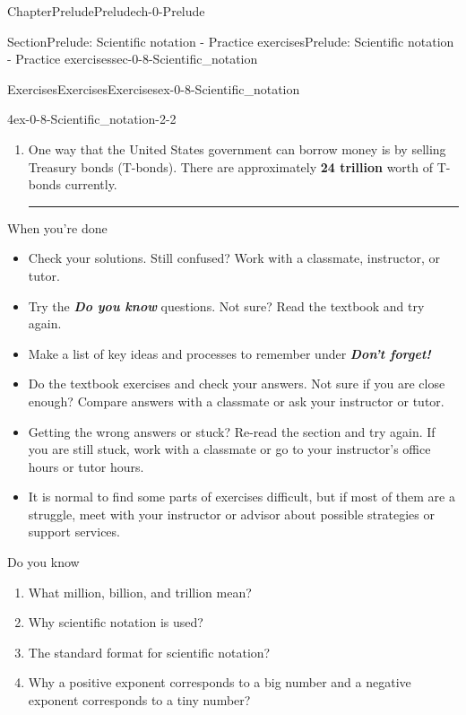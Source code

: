 \documentclass[twoside,11pt,]{book}
\newcommand{\xreffont}{\relax}
\newcommand{\alert}[1]{\textbf{\textit{#1}}}
\newcommand{\terminology}[1]{\textbf{#1}}
\newlength{\workspacestrutwidth}
\numberwithin{equation}{section}
\begin{document}
\begin{chapterptx}{Chapter}{Prelude}{}{Prelude}{}{}{ch-0-Prelude}
\begin{sectionptx}{Section}{Prelude: Scientific notation - Practice exercises}{}{Prelude: Scientific notation - Practice exercises}{}{}{sec-0-8-Scientific_notation}
\begin{exercises-subsection-numberless}{Exercises}{Exercises}{}{Exercises}{}{}{ex-0-8-Scientific_notation}
\begin{divisionexercise}{4}{}{}{ex-0-8-Scientific_notation-2-2}
\begin{enumerate}[label=(\alph*),ref=\alph*]
\begin{aside}{Aside}{}{world-population-prelude-scientific-notation-1-1-2}
(Story also appears in \hyperlink{world-population-percentages}{{\xreffont 0.3.1}})%
\end{aside}
%
\par\rule{\workspacestrutwidth}{0.5in}%
\item\label{t-bonds-prelude-scientific-notation}One way that the United States government can borrow money is by selling Treasury bonds (T-bonds). There are approximately \terminology{\textdollar{}24 trillion} worth of T-bonds currently.%
\par\rule{\workspacestrutwidth}{0in}%
\end{enumerate}%
\end{divisionexercise}%
\end{exercises-subsection-numberless}
\begin{conclusion}{When you're done \textellipsis{}}%
%
\begin{itemize}[label=\textbullet]
\item{}Check your solutions. Still confused? Work with a classmate, instructor, or tutor.%
\item{}Try the \alert{Do you know} questions. Not sure? Read the textbook and try again.%
\item{}Make a list of key ideas and processes to remember under \alert{Don't forget!}%
\item{}Do the textbook exercises and check your answers. Not sure if you are close enough? Compare answers with a classmate or ask your instructor or tutor.%
\item{}Getting the wrong answers or stuck? Re-read the section and try again. If you are still stuck, work with a classmate or go to your instructor's office hours or tutor hours.%
\item{}It is normal to find some parts of exercises difficult, but if most of them are a struggle, meet with your instructor or advisor about possible strategies or support services.%
\end{itemize}
%
\end{conclusion}%
\begin{conclusion}{Do you know \textellipsis{}}%
%
\begin{enumerate}[label={\Alph*.}]
\item{}What million, billion, and trillion mean?%
\item{}Why scientific notation is used?%
\item{}The standard format for scientific notation?%
\item{}Why a positive exponent corresponds to a big number and a negative exponent corresponds to a tiny number?%

\end{enumerate}
\end{conclusion}
\end{sectionptx}
\end{chapterptx}
\end{document}
